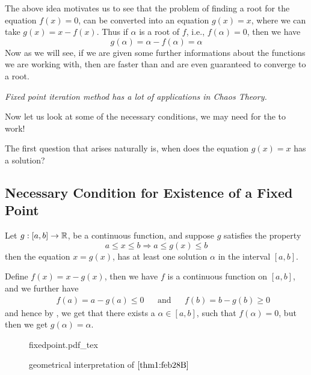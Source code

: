 The above idea motivates us to see that the problem of finding a root for the equation $f(x) = 0$, can be converted into an equation $g(x) = x$, where we can take $g(x) = x - f(x)$. Thus if $\alpha$ is a root of $f$, i.e., $f(\alpha) = 0$, then we have 
\[g(\alpha) = \alpha - f(\alpha) = \alpha\]
Now as we will see, if we are given some further informations about the functions we are working with, then  are faster than  and are even guaranteed to converge to a root.

\begin{tcolorbox}[
    colback = cyan!5,
    colframe = cyan!75
]
     \textit{Fixed point iteration method has a lot of applications in Chaos Theory.} 
\end{tcolorbox}

Now let us look at some of the necessary conditions, we may need for the  to work! 

The first question that arises naturally is, when does the equation $g(x) = x$ has a solution?

\subsection{Necessary Condition for Existence of a Fixed Point}

\begin{thm}\label{thm1:feb28B}
    Let $g :[a,b] \to \mathbb{R}$, be a continuous function, and suppose $g$ satisfies the property 
    \[
        a \leq x \leq b \Rightarrow a \leq g(x) \leq b
    \]
    then the equation $x = g(x)$, has at least one solution $ \alpha $ in the interval $[a,b]$.
\end{thm}

\begin{prf}
    Define $f(x) = x - g(x)$, then we have $f$ is a continuous function on $[a,b]$, and we further have 
    \begin{align*}
        &&f(a) = a-g(a) \leq 0 &&\mbox{and} &&f(b) = b - g(b) \geq 0
    \end{align*}
    and hence by , we get that there exists a $\alpha \in [a,b]$, such that $f(\alpha) = 0$, but then we get $g(\alpha) = \alpha$.
\end{prf}

\begin{figure}[H]
	\centering
	\def\svgwidth{0.8\textwidth}
	{fixedpoint.pdf_tex}
	\caption{geometrical interpretation of  $\ref{thm1:feb28B}$}
	\label{fig1:feb28B}
\end{figure}

